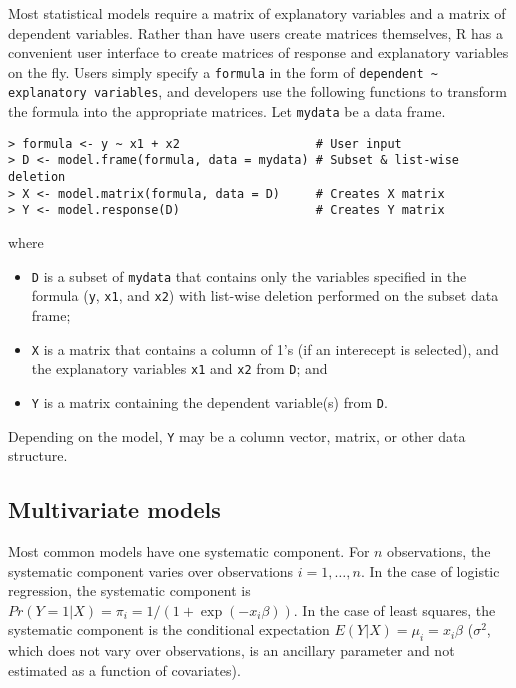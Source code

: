 \documentclass[oneside,letterpaper,12pt]{article}
\begin{document}
Most statistical models require a matrix of explanatory variables and
a matrix of dependent variables.  Rather than have users create
matrices themselves, R has a convenient user interface to create
matrices of response and explanatory variables on the fly.  Users
simply specify a {\tt formula} in the form of 
\verb|dependent ~ explanatory variables|, and developers use the
following functions to transform the formula into the appropriate
matrices.  Let {\tt mydata} be a data frame.  
\begin{verbatim}
> formula <- y ~ x1 + x2                   # User input
> D <- model.frame(formula, data = mydata) # Subset & list-wise deletion
> X <- model.matrix(formula, data = D)     # Creates X matrix
> Y <- model.response(D)                   # Creates Y matrix
\end{verbatim}
where 
\begin{itemize}
\item {\tt D} is a subset of {\tt mydata} that contains only the
variables specified in the formula ({\tt y}, {\tt x1}, and {\tt x2})
with list-wise deletion performed on the subset data frame; 
\item {\tt X} is a matrix that contains a column of 1's (if an
interecept is selected), and the explanatory variables {\tt x1} and
{\tt x2} from {\tt D}; and
\item {\tt Y} is a matrix containing the dependent variable(s) from
{\tt D}.  
\end{itemize}  
Depending on the model, {\tt Y} may be a column vector, matrix, or
other data structure.

\subsection{Multivariate models}  

Most common models have one systematic component.  For $n$
observations, the systematic component varies over observations $i =
1, \dots, n$.  In the case of logistic regression, the systematic
component is $Pr(Y=1|X) = \pi_i = 1 / (1 + \exp(-x_i \beta))$.  In the
case of least squares, the systematic component is the conditional
expectation $E(Y|X) = \mu_i = x_i \beta$ ($\sigma^2$, which does not
vary over observations, is an ancillary parameter and not estimated as
a function of covariates).
\end{document}
